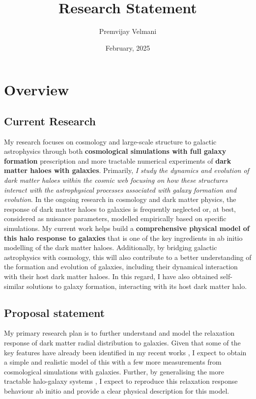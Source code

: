 \documentclass[10pt]{article}
\title{Research Statement}
\author{Premvijay Velmani}
\date{February, 2025}
\begin{document}
\maketitle


\section{Overview}
\subsection{Current Research}
My research focuses on cosmology and large-scale structure to galactic astrophysics through both \textbf{cosmological simulations with full galaxy formation} prescription and more tractable numerical experiments of \textbf{dark matter haloes with galaxies}. Primarily, \textit{I study the dynamics and evolution of dark matter haloes within the cosmic web focusing on how these structures interact with the astrophysical processes associated with galaxy formation and evolution}. In the ongoing research in cosmology and dark matter physics, the response of dark matter haloes to galaxies is frequently neglected or, at best, considered as nuisance parameters, modelled empirically based on specific simulations. My current work helps build a \textbf{comprehensive physical model of this halo response to galaxies} that is one of the key ingredients in ab initio modelling of the dark matter haloes. Additionally, by bridging galactic astrophysics with cosmology, this will also contribute to a better understanding of the formation and evolution of galaxies, including their dynamical interaction with their host dark matter haloes. In this regard, I have also obtained self-similar solutions to galaxy formation, interacting with its host dark matter halo.

\subsection{Proposal statement}
My primary research plan is to further understand and model the relaxation response of dark matter radial distribution to galaxies. Given that some of the key features have already been identified in my recent works \cite{2023MNRAS.520.2867V,2024arXiv240708030V,2024arXiv240804864V}, I expect to obtain a simple and realistic model of this with a few more measurements from cosmological simulations with galaxies. Further, by generalising the more tractable halo-galaxy systems \cite{2024JCAP...05..080V}, I expect to reproduce this relaxation response behaviour ab initio and provide a clear physical description for this model. 
\end{document}

